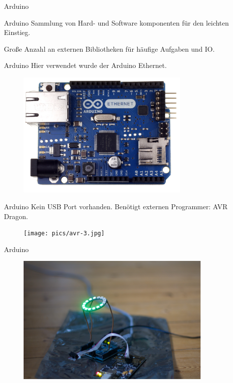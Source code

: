\documentclass{beamer}
\begin{document}
\begin{frame}[fragile]{Arduino}
  \begin{alertblock}{Arduino}
    Sammlung von Hard- und Software komponenten für den leichten Einstieg.

    Große Anzahl an externen Bibliotheken für häufige Aufgaben und IO.
  \end{alertblock}
\end{frame}


\begin{frame}[fragile]{Arduino}
  Hier verwendet wurde der Arduino Ethernet.
  \begin{figure}[ht]
    \centering
      \includegraphics[width=0.75\textwidth]{pics/ArduinoEthernetFront.jpg}
  \end{figure}
\end{frame}


\begin{frame}[fragile]{Arduino}
  Kein USB Port vorhanden. Benötigt externen Programmer: AVR Dragon.
  \begin{figure}[ht]
    \centering
      \texttt{[image: pics/avr-3.jpg]}
  \end{figure}
\end{frame}

\begin{frame}[fragile]{Arduino}
  \begin{figure}[ht]
    \centering
      \includegraphics[width=0.85\textwidth]{pics/avr-2.jpg}
  \end{figure}
\end{frame}
\end{document}
